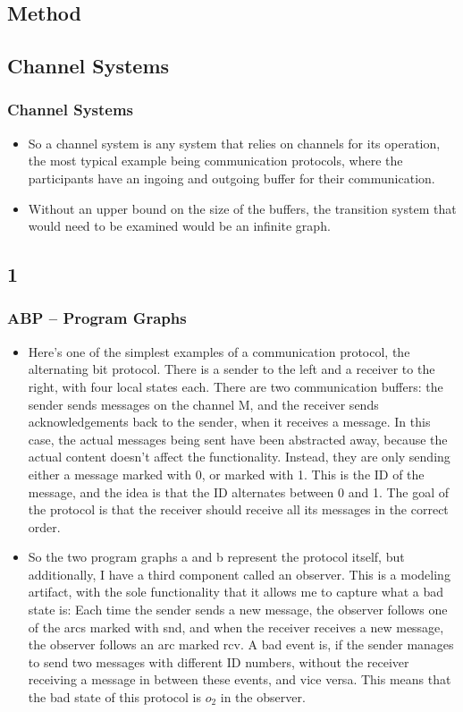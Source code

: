 \documentclass[handout]{beamer}
\begin{document}
\begin{footnotesize}
\section{Method}
\subsection{Channel Systems}
\begin{frame}
  \frametitle{Channel Systems}
  \begin{itemize}
  \item
So a channel system is any system that relies on channels for its operation, the most typical example being communication protocols, where the participants have an ingoing and outgoing buffer for their communication.
\item
Without an upper bound on the size of the buffers, the transition system that would need to be examined would be an infinite graph.
    \end{itemize}
\end{frame}

\subsection*{1}
\begin{frame}
\frametitle{ABP -- Program Graphs}
\begin{itemize}
\item
Here's one of the simplest examples of a communication protocol, the alternating bit protocol. There is a sender to the left and a receiver to the right, with four local states each. There are two communication buffers: the sender sends messages on the channel M, and the receiver sends acknowledgements back to the sender, when it receives a message. In this case, the actual messages being sent have been abstracted away, because the actual content doesn't affect the functionality. Instead, they are only sending either a message marked with 0, or marked with 1. This is the ID of the message, and the idea is that the ID alternates between 0 and 1. The goal of the protocol is that the receiver should receive all its messages in the correct order.
\item
So the two program graphs a and b represent the protocol itself, but additionally, I have a third component called an observer. This is a modeling artifact, with the sole functionality that it allows me to capture what a bad state is: Each time the sender sends a new message, the observer follows one of the arcs marked with snd, and when the receiver receives a new message, the observer follows an arc marked rcv. A bad event is, if the sender manages to send two messages with different ID numbers, without the receiver receiving a message in between these events, and vice versa. This means that the bad state of this protocol is $o_2$ in the observer.
\end{itemize}
\end{frame}


\end{footnotesize}
\end{document}
